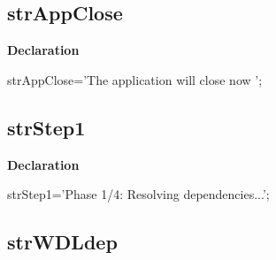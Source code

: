 \documentclass{report}
\newif\ifpdf
\begin{document}
\subsection*{strAppClose}
\fi
\label{trstrings-strAppClose}
\begin{list}{}{
\setlength{\itemindent}{0cm}
\setlength{\listparindent}{0cm}
\setlength{\leftmargin}{\evensidemargin}
\addtolength{\leftmargin}{\tmplength}
\settowidth{\labelsep}{X}
\addtolength{\leftmargin}{\labelsep}
\setlength{\labelwidth}{\tmplength}
}
\item[\textbf{Declaration}\hfill]
\ifpdf
\begin{flushleft}
\fi
\begin{ttfamily}
strAppClose='The application will close now ';\end{ttfamily}

\ifpdf
\end{flushleft}
\fi

\end{list}
\ifpdf
\subsection*{\large{\textbf{strStep1}}\normalsize\hspace{1ex}\hrulefill}
\else
\subsection*{strStep1}
\fi
\label{trstrings-strStep1}
\begin{list}{}{
\setlength{\itemindent}{0cm}
\setlength{\listparindent}{0cm}
\setlength{\leftmargin}{\evensidemargin}
\addtolength{\leftmargin}{\tmplength}
\settowidth{\labelsep}{X}
\addtolength{\leftmargin}{\labelsep}
\setlength{\labelwidth}{\tmplength}
}
\item[\textbf{Declaration}\hfill]
\ifpdf
\begin{flushleft}
\fi
\begin{ttfamily}
strStep1='Phase 1/4: Resolving dependencies...';\end{ttfamily}

\ifpdf
\end{flushleft}
\fi

\end{list}
\ifpdf
\subsection*{\large{\textbf{strWDLdep}}\normalsize\hspace{1ex}\hrulefill}
\else
\end{document}
